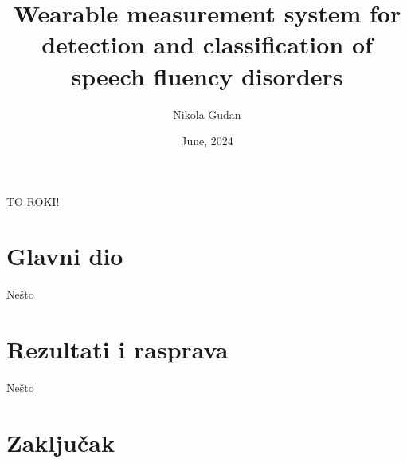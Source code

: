\documentclass[diplomskirad]{fer}
\title{Wearable measurement system for detection and classification of speech fluency disorders}
\author{Nikola Gudan}
\date{June, 2024}
\begin{document}
\maketitle






\begin{zahvale}
  TO ROKI!
\end{zahvale}


\mainmatter


\tableofcontents


%
\chapter{Glavni dio}
\label{pog:glavni_dio}



Nešto


\chapter{Rezultati i rasprava}
\label{pog:rezultati_i_rasprava}

Nešto


\chapter{Zaključak}
\label{pog:zakljucak}


\end{document}
